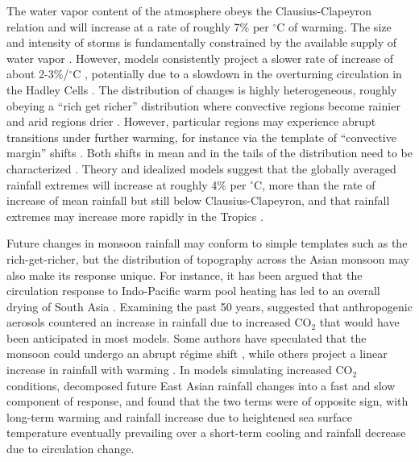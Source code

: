 	The water vapor content of the atmosphere obeys the Clausius-Clapeyron relation and will increase at a rate of roughly 7\% per $^{\circ}$C of warming. The size and intensity of storms is fundamentally constrained by the available supply of water vapor \citep{Trenberth2003}. However, models consistently project a slower rate of increase of about 2-3\%/$^{\circ}$C \citep{Allen2002}, potentially due to a slowdown in the overturning circulation in the Hadley Cells \citep{Held2006}. The distribution of changes is highly heterogeneous, roughly obeying a ``rich get richer'' distribution where convective regions become rainier and arid regions drier \citep{Chou2009}. However, particular regions may experience abrupt transitions under further warming, for instance via the template of ``convective margin'' shifts \citep{Lintner2007}. Both shifts in mean and in the tails of the distribution need to be characterized \cite{Pendergrass2014b}. Theory and idealized models suggest that the globally averaged rainfall extremes will increase at roughly 4\% per $^{\circ}$C, more than the rate of increase of mean rainfall but still below Clausius-Clapeyron, and that rainfall extremes may increase more rapidly in the Tropics \citep{Ogorman2009,Muller2011a,OGorman2012}.
	
	Future changes in monsoon rainfall may conform to simple templates such as the rich-get-richer, but the distribution of topography across the Asian monsoon may also make its response unique. For instance, it has been argued that the circulation response to Indo-Pacific warm pool heating has led to an overall drying of South Asia \citep{Annamalai2013}. Examining the past 50 years, \citet{Turner2012} suggested that anthropogenic aerosols countered an increase in rainfall due to increased CO$_2$ that would have been anticipated in most models. Some authors have speculated that the monsoon could undergo an abrupt r\'{e}gime shift \citep{Zickfeld2005}, while others project a linear increase in rainfall with warming \citep{Boos2016}. In models simulating increased CO$_2$ conditions, \citet{Chen2016} decomposed future East Asian rainfall changes  into a fast and slow component of response, and found that the two terms were of opposite sign, with long-term warming and rainfall increase due to heightened sea surface temperature eventually prevailing over a short-term cooling and rainfall decrease due to circulation change.
		
